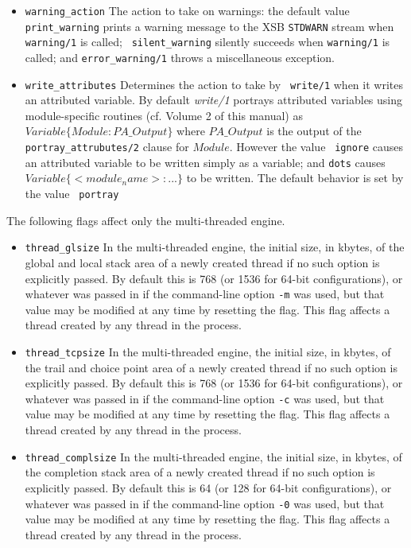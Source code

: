 \begin{description}
\begin{itemize}
\item {\tt warning\_action} The action to take on warnings: the
  default value {\tt print\_warning} prints a warning message to the
  XSB {\tt STDWARN} stream when {\tt warning/1} is called; {\tt
    silent\_warning} silently succeeds when {\tt warning/1} is called;
  and {\tt error\_warning/1} throws a miscellaneous exception.

\item {\tt write\_attributes} Determines the action to take by {\tt
  write/1} when it writes an attributed variable.  By default {\em
  write/1} portrays attributed variables using module-specific
  routines (cf. Volume 2 of this manual) as $Variable \{ Module :
  PA\_Output\}$ where $PA\_Output$ is the output of the {\tt
    portray\_attrubutes/2} clause for $Module$.  However the value {\tt
    ignore} causes an attributed variable to be written simply as a
  variable; and {\tt dots} causes $Variable \{ <module_name> : ...\}$
  to be written.  The default behavior is set by the value {\tt
    portray}
\end{itemize}

The following flags affect only the multi-threaded engine.

\begin{itemize}
\item {\tt thread\_glsize} In the multi-threaded engine, the initial
  size, in kbytes, of the global and local stack area of a newly
  created thread if no such option is explicitly passed.  By default
  this is 768 (or 1536 for 64-bit configurations), or whatever was
  passed in if the command-line option {\tt -m} was used, but that
  value may be modified at any time by resetting the flag.  This flag
  affects a thread created by any thread in the process.

\item {\tt thread\_tcpsize} In the multi-threaded engine, the initial
  size, in kbytes, of the trail and choice point area of a newly
  created thread if no such option is explicitly passed.  By default
  this is 768 (or 1536 for 64-bit configurations), or whatever was
  passed in if the command-line option {\tt -c} was used, but that
  value may be modified at any time by resetting the flag.  This flag
  affects a thread created by any thread in the process.

\item {\tt thread\_complsize} In the multi-threaded engine, the
  initial size, in kbytes, of the completion stack area of a newly
  created thread if no such option is explicitly passed.  By default
  this is 64 (or 128 for 64-bit configurations), or whatever was
  passed in if the command-line option {\tt -0} was used, but that
  value may be modified at any time by resetting the flag.  This flag
  affects a thread created by any thread in the process.


\end{itemize}
\end{description}
